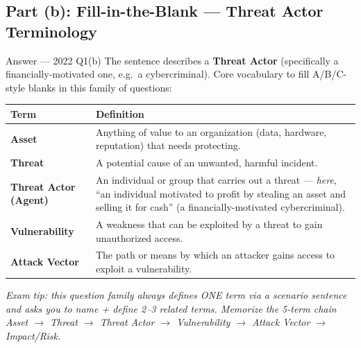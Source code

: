 \documentclass[12pt,a4paper]{article}
\begin{document}
\subsection{Part (b): Fill-in-the-Blank --- Threat Actor Terminology}
\begin{solbox}{Answer --- 2022 Q1(b)}
The sentence describes a \textbf{Threat Actor} (specifically a financially-motivated one, e.g.\ a cybercriminal). Core vocabulary to fill A/B/C-style blanks in this family of questions:
\begin{center}
\renewcommand{\arraystretch}{1.3}
\begin{tabular}{l|p{10cm}}
\toprule
\textbf{Term} & \textbf{Definition} \\
\midrule
\textbf{Asset} & Anything of value to an organization (data, hardware, reputation) that needs protecting. \\
\textbf{Threat} & A potential cause of an unwanted, harmful incident. \\
\textbf{Threat Actor (Agent)} & An individual or group that carries out a threat --- \emph{here}, ``an individual motivated to profit by stealing an asset and selling it for cash'' (a financially-motivated cybercriminal). \\
\textbf{Vulnerability} & A weakness that can be exploited by a threat to gain unauthorized access. \\
\textbf{Attack Vector} & The path or means by which an attacker gains access to exploit a vulnerability. \\
\bottomrule
\end{tabular}
\end{center}
\textit{Exam tip: this question family always defines ONE term via a scenario sentence and asks you to name + define 2--3 related terms. Memorize the 5-term chain Asset $\to$ Threat $\to$ Threat Actor $\to$ Vulnerability $\to$ Attack Vector $\to$ Impact/Risk.}
\end{solbox}
\end{document}

